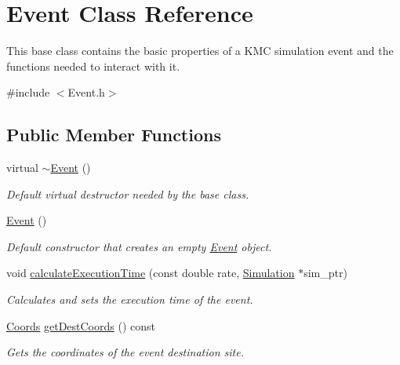 \hypertarget{class_event}{}\section{Event Class Reference}
\label{class_event}


This base class contains the basic properties of a K\+MC simulation event and the functions needed to interact with it.  




{\ttfamily \#include $<$Event.\+h$>$}

\subsection*{Public Member Functions}
\begin{DoxyCompactItemize}
\item 
\mbox{\label{class_event_a7704ec01ce91e673885792054214b3d2}} 
virtual \hyperlink{class_event_a7704ec01ce91e673885792054214b3d2}{$\sim$\+Event} ()
\begin{DoxyCompactList}\small\item\em Default virtual destructor needed by the base class. \end{DoxyCompactList}\item 
\mbox{\label{class_event_a5a40dd4708297f7031e29b39e039ae10}} 
\hyperlink{class_event_a5a40dd4708297f7031e29b39e039ae10}{Event} ()
\begin{DoxyCompactList}\small\item\em Default constructor that creates an empty \hyperlink{class_event}{Event} object. \end{DoxyCompactList}\item 
void \hyperlink{class_event_a14b3f90f4b4d72ab1d0bf70f9b4cc907}{calculate\+Execution\+Time} (const double rate, \hyperlink{class_simulation}{Simulation} $\ast$sim\+\_\+ptr)
\begin{DoxyCompactList}\small\item\em Calculates and sets the execution time of the event. \end{DoxyCompactList}\item 
\hyperlink{struct_coords}{Coords} \hyperlink{class_event_a6b4287971afaca8211f91f361ef55997}{get\+Dest\+Coords} () const
\begin{DoxyCompactList}\small\item\em Gets the coordinates of the event destination site. \end{DoxyCompactList}\item 

\end{DoxyCompactItemize}

